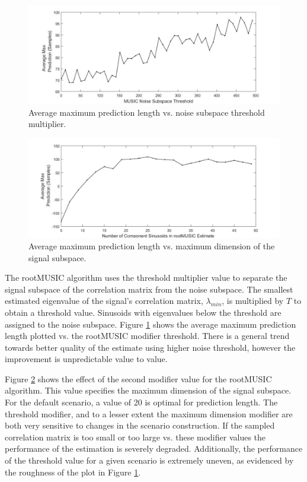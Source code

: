 \documentclass{allertonproc}
\begin{document}
\begin{figure}[ptb]
\begin{center}
\includegraphics[width=6in]{musicNoise.jpg}
\caption{Average maximum prediction length vs. noise subspace threshold multiplier. }\label{thresh}
\end{center}
\end{figure}

\begin{figure}[ptb]
\begin{center}
\includegraphics[width=6in]{numSinusoids.jpg}
\caption{Average maximum prediction length vs. maximum dimension of the signal subspace. }\label{sinusoid}
\end{center}
\end{figure}
The rootMUSIC algorithm uses the threshold multiplier value to separate the signal subspace of the correlation matrix from the noise subspace. The smallest estimated eigenvalue of the signal's correlation matrix, $\lambda_{min}$, is multiplied by $T$ to obtain a threshold value.  Sinusoids with eigenvalues below the threshold are assigned to the noise subspace\cite{matlab}. Figure \ref{thresh} shows the average maximum prediction length plotted vs. the rootMUSIC modifier threshold. There is a general trend towards better quality of the estimate using higher noise threshold, however the improvement is unpredictable value to value.%

Figure \ref{sinusoid} shows the effect of the second modifier value for the rootMUSIC algorithm. This value specifies the maximum dimension of the signal subspace. For the default scenario, a value of 20 is optimal for prediction length. The threshold modifier, and to a lesser extent the maximum dimension modifier are both very sensitive to changes in the scenario construction. If the sampled correlation matrix is too small or too large vs. these modifier values the performance of the estimation is severely degraded. Additionally, the performance of the threshold value for a given scenario is extremely uneven, as evidenced by the roughness of the plot in Figure \ref{thresh}.
\end{document}
